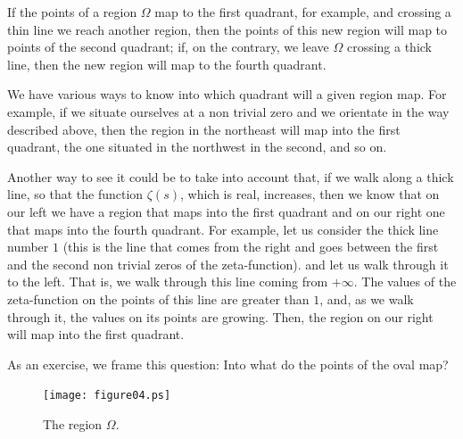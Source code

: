 \documentclass[a4paper]{amsart}
\numberwithin{equation}{section}
\begin{document}
\begin{large}

If the points of a region $\Omega$ map to the first quadrant, for example,
and crossing a thin line we reach another region, then the points of this new
region will map to points of the second quadrant; if, on the contrary, we
leave $\Omega$ crossing a thick line, then the new region will map to the
fourth quadrant.

We have various ways to know into which quadrant will a given region 
map. For
example, if we situate ourselves at a non trivial zero and we orientate in the
way described above, then the region in the northeast will map into the first
quadrant, the one situated in the northwest in the second, and so on.

Another way to see it could be to take into account that, if we
walk along a thick line, so that the function $\zeta(s)$, which is
real, increases, then we know that on our left we have a region
that maps into the first quadrant and on our right one that 
maps into the fourth quadrant. For example, let us consider the
thick line number $1$ (this is the line that  comes from the right
and goes between the first and the second non trivial zeros of the
zeta-function). and let us walk through it to the left. That is,
we walk through this line coming from $+\infty$. The values of the
zeta-function on the points of this line are greater than $1$,
and, as we walk through it, the values on its points are growing.
Then, the region on our right will map into the first quadrant.

\vfil

As an exercise, we frame this question: Into what do the points of the 
oval map?
\goodbreak


\end{large}


\begin{figure}
\texttt{[image: figure04.ps]}
\caption{The region $\Omega$.}
\end{figure}
\end{document}
